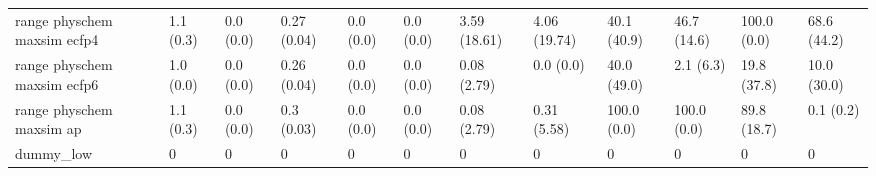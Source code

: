 \begin{tabular}{llllllllllll}
range physchem maxsim ecfp4 & {\cellcolor[HTML]{F6FCFD}} \color[HTML]{000000} 1.1 (0.3) & {\cellcolor[HTML]{F7FCFD}} \color[HTML]{000000} 0.0 (0.0) & {\cellcolor[HTML]{5EBE9B}} \color[HTML]{000000} 0.27 (0.04) & {\cellcolor[HTML]{F7FCFD}} \color[HTML]{000000} 0.0 (0.0) & {\cellcolor[HTML]{F7FCFD}} \color[HTML]{000000} 0.0 (0.0) & {\cellcolor[HTML]{F2FAFC}} \color[HTML]{000000} 3.59 (18.61) & {\cellcolor[HTML]{F1FAFC}} \color[HTML]{000000} 4.06 (19.74) & {\cellcolor[HTML]{00441B}} \color[HTML]{F1F1F1} 40.1 (40.9) & {\cellcolor[HTML]{00441B}} \color[HTML]{F1F1F1} 46.7 (14.6) & {\cellcolor[HTML]{006428}} \color[HTML]{F1F1F1} 100.0 (0.0) & {\cellcolor[HTML]{F7FCFD}} \color[HTML]{000000} 68.6 (44.2) \\
range physchem maxsim ecfp6 & {\cellcolor[HTML]{F6FCFD}} \color[HTML]{000000} 1.0 (0.0) & {\cellcolor[HTML]{F7FCFD}} \color[HTML]{000000} 0.0 (0.0) & {\cellcolor[HTML]{51B689}} \color[HTML]{F1F1F1} 0.26 (0.04) & {\cellcolor[HTML]{F7FCFD}} \color[HTML]{000000} 0.0 (0.0) & {\cellcolor[HTML]{F7FCFD}} \color[HTML]{000000} 0.0 (0.0) & {\cellcolor[HTML]{F7FCFD}} \color[HTML]{000000} 0.08 (2.79) & {\cellcolor[HTML]{F7FCFD}} \color[HTML]{000000} 0.0 (0.0) & {\cellcolor[HTML]{00441B}} \color[HTML]{F1F1F1} 40.0 (49.0) & {\cellcolor[HTML]{00441B}} \color[HTML]{F1F1F1} 2.1 (6.3) & {\cellcolor[HTML]{00441B}} \color[HTML]{F1F1F1} 19.8 (37.8) & {\cellcolor[HTML]{E9F7FA}} \color[HTML]{000000} 10.0 (30.0) \\
range physchem maxsim ap & {\cellcolor[HTML]{F6FCFD}} \color[HTML]{000000} 1.1 (0.3) & {\cellcolor[HTML]{F7FCFD}} \color[HTML]{000000} 0.0 (0.0) & {\cellcolor[HTML]{5EBE9B}} \color[HTML]{000000} 0.3 (0.03) & {\cellcolor[HTML]{F7FCFD}} \color[HTML]{000000} 0.0 (0.0) & {\cellcolor[HTML]{F7FCFD}} \color[HTML]{000000} 0.0 (0.0) & {\cellcolor[HTML]{F7FCFD}} \color[HTML]{000000} 0.08 (2.79) & {\cellcolor[HTML]{F7FCFD}} \color[HTML]{000000} 0.31 (5.58) & {\cellcolor[HTML]{00441B}} \color[HTML]{F1F1F1} 100.0 (0.0) & {\cellcolor[HTML]{00441B}} \color[HTML]{F1F1F1} 100.0 (0.0) & {\cellcolor[HTML]{026F2E}} \color[HTML]{F1F1F1} 89.8 (18.7) & {\cellcolor[HTML]{D6F0EE}} \color[HTML]{000000} 0.1 (0.2) \\
dummy_low & {\cellcolor[HTML]{F7FCFD}} \color[HTML]{000000} 0 & {\cellcolor[HTML]{F7FCFD}} \color[HTML]{000000} 0 & {\cellcolor[HTML]{F7FCFD}} \color[HTML]{000000} 0 & {\cellcolor[HTML]{F7FCFD}} \color[HTML]{000000} 0 & {\cellcolor[HTML]{F7FCFD}} \color[HTML]{000000} 0 & {\cellcolor[HTML]{F7FCFD}} \color[HTML]{000000} 0 & {\cellcolor[HTML]{F7FCFD}} \color[HTML]{000000} 0 & {\cellcolor[HTML]{F7FCFD}} \color[HTML]{000000} 0 & {\cellcolor[HTML]{F7FCFD}} \color[HTML]{000000} 0 & {\cellcolor[HTML]{F7FCFD}} \color[HTML]{000000} 0 & {\cellcolor[HTML]{F7FCFD}} \color[HTML]{000000} 0 \\

\end{tabular}
